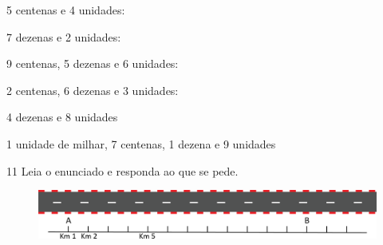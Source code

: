 \begin{escolha}
\item 5 centenas e 4 unidades:

\item 7 dezenas e 2 unidades:

\item 9 centenas, 5 dezenas e 6 unidades:

\item 2 centenas, 6 dezenas e 3 unidades:

\item 4 dezenas e 8 unidades

\item 1 unidade de milhar, 7 centenas, 1 dezena e 9 unidades

\end{escolha}

\num{11} Leia o enunciado e responda ao que se pede. 

\vspace{1em}

\begin{figure}[htpb!]
\centering
\includegraphics[width=\textwidth]{./media/image6.png}
\end{figure}

